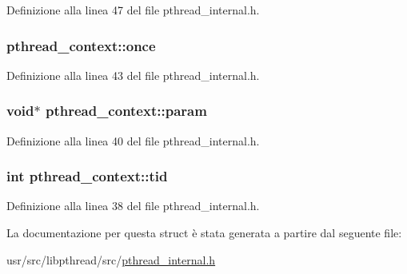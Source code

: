 Definizione alla linea 47 del file pthread\+\_\+internal.\+h.

\hypertarget{structpthread__context_a33f7f059b1d0cda2a8675d13600b6dd2}{
\subsubsection[{once}]{ pthread\+\_\+context\+::once}}\label{structpthread__context_a33f7f059b1d0cda2a8675d13600b6dd2}


Definizione alla linea 43 del file pthread\+\_\+internal.\+h.

\hypertarget{structpthread__context_afb0244aa84b0403cc0df2cd6ebdb94b4}{
\subsubsection[{param}]{\setlength{\rightskip}{0pt plus 5cm}void$\ast$ pthread\+\_\+context\+::param}}\label{structpthread__context_afb0244aa84b0403cc0df2cd6ebdb94b4}


Definizione alla linea 40 del file pthread\+\_\+internal.\+h.

\hypertarget{structpthread__context_a5b7aa396dbf3c140b1a54f09568c8253}{
\subsubsection[{tid}]{\setlength{\rightskip}{0pt plus 5cm}int pthread\+\_\+context\+::tid}}\label{structpthread__context_a5b7aa396dbf3c140b1a54f09568c8253}


Definizione alla linea 38 del file pthread\+\_\+internal.\+h.



La documentazione per questa struct è stata generata a partire dal seguente file\+:\begin{DoxyCompactItemize}
\item 
usr/src/libpthread/src/\hyperlink{pthread__internal_8h}{pthread\+\_\+internal.\+h}\end{DoxyCompactItemize}
